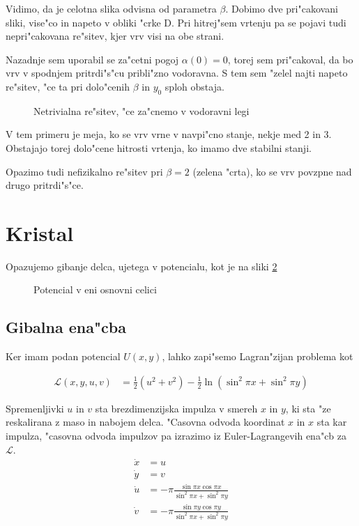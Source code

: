 \documentclass[a4paper,10pt]{article}
\newcommand{\lag}{\mathcal{L}}
\begin{document}
Vidimo, da je celotna slika odvisna od parametra $\beta$. Dobimo dve pri"cakovani sliki, vise"co in napeto v obliki "crke D.  Pri hitrej"sem vrtenju pa se pojavi tudi nepri"cakovana re"sitev, kjer vrv visi na obe strani. 

Nazadnje sem uporabil se za"cetni pogoj $\alpha(0)=0$, torej sem pri"cakoval, da bo vrv v spodnjem pritrdi"s"cu pribli"zno vodoravna. S tem sem "zelel najti napeto re"sitev, "ce ta pri dolo"cenih $\beta$ in $y_0$ sploh obstaja. 

\begin{figure}[H]
 \centering
 
 \caption{Netrivialna re"sitev, "ce za"cnemo v vodoravni legi}
 \label{fig:vrv-vodoravna-05}
\end{figure}

V tem primeru je meja, ko se vrv vrne v navpi"cno stanje, nekje med 2 in 3. Obstajajo torej dolo"cene hitrosti vrtenja, ko imamo dve stabilni stanji. 

Opazimo tudi nefizikalno re"sitev pri $\beta=2$ (zelena "crta), ko se vrv povzpne nad drugo pritrdi"s"ce. 

\section{Kristal}

Opazujemo gibanje delca, ujetega v potencialu, kot je na sliki \ref{fig:potencial}

\begin{figure}[h]
 \centering
 
 \caption{Potencial v eni osnovni celici}
 \label{fig:potencial}
\end{figure}


\subsection{Gibalna ena"cba}

Ker imam podan potencial $U(x,y)$, lahko zapi"semo Lagran"zijan problema kot

\begin{align}
 \lag(x,y,u,v) &= \frac{1}{2} \left( u^2 + v^2 \right) - \frac{1}{2}\ln \left( \sin^2 \pi x + \sin^2 \pi y\right)
\end{align}

Spremenljivki $u$ in $v$ sta brezdimenzijska impulza v smereh $x$ in $y$, ki sta "ze reskalirana z maso in nabojem delca. "Casovna odvoda koordinat $x$ in $x$ sta kar impulza, "casovna odvoda impulzov pa izrazimo iz Euler-Lagrangevih ena"cb za $\lag$. 
\begin{align}
 \dot{x} &= u \\
 \dot{y} &= v \\
 \dot{u} &= -\pi \frac{\sin \pi x \cos \pi x}{\sin^2 \pi x + \sin^2 \pi y} \\
 \dot{v} &= -\pi \frac{\sin \pi y \cos \pi y}{\sin^2 \pi x + \sin^2 \pi y} 
\end{align}
\end{document}
